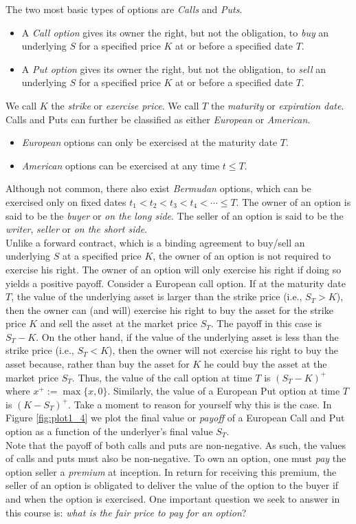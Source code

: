 \documentclass[12pt]{book}
\numberwithin{equation}{chapter}
\theoremstyle{plain}
\numberwithin{theorem}{section}
\theoremstyle{definition}
\numberwithin{exercise}{chapter}
\newcommand{\<}{\langle}
\renewcommand{\>}{\rangle}
\renewcommand{\(}{\left(}
\renewcommand{\)}{\right)}
\renewcommand{\[}{\left[}
\renewcommand{\]}{\right]}
\theoremstyle{definition}
\numberwithin{question}{section}
\begin{document}
The two most basic types of options are \textit{Calls} and \textit{Puts}.
\begin{itemize}
	\item A \textit{Call option} gives its owner the right, but not the obligation, to \textit{buy} an underlying $S$ for a specified price $K$ at or before a specified date $T$.
	\item A \textit{Put option} gives its owner the right, but not the obligation, to \textit{sell} an underlying $S$ for a specified price $K$ at or before a specified date $T$.
\end{itemize}
We call $K$ the \textit{strike} or \textit{exercise price}.  We call $T$  the \textit{maturity} or \textit{expiration date}.  Calls and Puts can further be classified as either \textit{European} or \textit{American}.
\begin{itemize}
\item \textit{European} options can only be exercised at the maturity date $T$. 
\item \textit{American} options can be exercised at any time $t \leq T$.
\end{itemize}
Although not common, there also exist  \textit{Bermudan} options, which can be exercised only on fixed dates $t_1 < t_2 < t_3 < t_4 < \cdots \leq T$.
The owner of an option is said to be the \textit{buyer} or \textit{on the long side}. The seller of an option is said to be the \textit{writer}, \textit{seller} or \textit{on the short side}.
\\[0.5em]
Unlike a forward contract, which is a binding agreement to buy/sell an underlying $S$ at a specified price $K$, the owner of an option is not required to exercise his right. The owner of an option will only exercise his right if doing so yields a positive payoff.  Consider a European call option.  If at the maturity date $T$, the value of the underlying asset is larger than the strike price (i.e., $S_T > K$), then the owner can (and will) exercise his right to buy the asset for the strike price $K$ and sell the asset at the market price $S_T$.  The payoff in this case is $S_T - K$.  On the other hand, if the value of the underlying asset is less than the strike price (i.e., $S_T < K$), then the owner will not exercise his right to buy the asset because, rather than buy the asset for $K$ he could buy the asset at the market price $S_T$.  Thus, the value of the call option at time $T$ is $(S_T - K)^+$ where $x^+ := \max\{ x, 0\}$.  Similarly, the value of a European Put option at time $T$ is $(K - S_T)^+$.  Take a moment to reason for yourself why this is the case.  In Figure \ref{fig:plot1_4} we plot the final value or \textit{payoff} of a European Call and Put option as a function of the underlyer's final value $S_T$.  
\\[0.5em]
Note that the payoff of both calls and puts are non-negative.  As such, the values of calls and puts must also be non-negative. To own an option, one must \textit{pay} the option seller a \textit{premium} at inception.  
In return for receiving this premium, the seller of an option is obligated to deliver the value of the option to the buyer if and when the option is exercised.
One important question we seek to answer in this course is: \textit{what is the fair price to pay for an option}?
\end{document}
